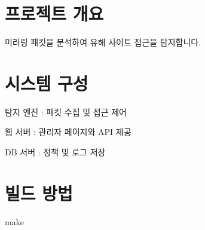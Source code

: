 \hypertarget{index_overview}{}\section{프로젝트 개요}\label{index_overview}
미러링 패킷을 분석하여 유해 사이트 접근을 탐지합니다.\hypertarget{index_architecture}{}\section{시스템 구성}\label{index_architecture}

\begin{DoxyItemize}
\item 탐지 엔진 \+: 패킷 수집 및 접근 제어
\item 웹 서버 \+: 관리자 페이지와 A\+PI 제공
\item DB 서버 \+: 정책 및 로그 저장
\end{DoxyItemize}\hypertarget{index_build}{}\section{빌드 방법}\label{index_build}

\begin{DoxyCode}
make
\end{DoxyCode}
 